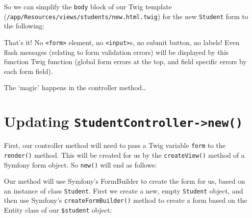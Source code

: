 \documentclass[a4paperpaper,openright]{book}
\newenvironment{Shaded}{}{}
\newcommand{\KeywordTok}[1]{\textcolor[rgb]{0.00,0.44,0.13}{\textbf{#1}}}
\newcommand{\NormalTok}[1]{#1}
\newcommand{\OtherTok}[1]{\textcolor[rgb]{0.00,0.44,0.13}{#1}}
\newcommand{\StringTok}[1]{\textcolor[rgb]{0.25,0.44,0.63}{#1}}
\begin{document}
So we can simplify the \texttt{body} block of our Twig template
(\texttt{/app/Resources/views/students/new.html.twig}) for the new
\texttt{Student} form to the following:

\begin{Shaded}
\end{Shaded}

That's it! No \texttt{\textless{}form\textgreater{}} element, no
\texttt{\textless{}input\textgreater{}}s, no submit button, no labels!
Even flash messages (relating to form validation errors) will be
displayed by this function Twig function (global form errors at the top,
and field specific errors by each form field).

The `magic' happens in the controller method\ldots{}

\hypertarget{updating-studentcontroller-new}{%
\section{\texorpdfstring{Updating
\texttt{StudentController-\textgreater{}new()}}{Updating StudentController-\textgreater{}new()}}\label{updating-studentcontroller-new}}

First, our controller method will need to pass a Twig variable
\texttt{form} to the \texttt{render()} method. This will be created for
us by the \texttt{createView()} method of a Symfony form object. So
\texttt{new()} will end as follows:

\begin{Shaded}
\end{Shaded}

Our method will use Symfony's FormBuilder to create the form for us,
based on an instance of class \texttt{Student}. First we create a new,
empty \texttt{Student} object, and then use Symfony's
\texttt{createFormBuilder()} method to create a form based on the Entity
class of our \texttt{\$student} object:
\end{document}
